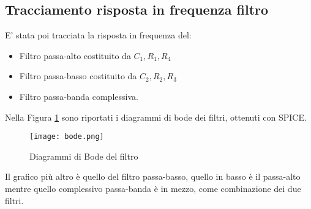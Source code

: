 \subsection{Tracciamento risposta in frequenza filtro}
E' stata poi tracciata la risposta in frequenza del:
\begin{itemize}
    \item Filtro passa-alto costituito da $C_1,R_1,R_4$
    \item Filtro passa-basso costituito da $C_2,R_2,R_3$
    \item Filtro passa-banda complessiva.
\end{itemize}
Nella Figura \ref{fig:bode} sono riportati i diagrammi di bode dei filtri, ottenuti con SPICE.
\begin{figure}[H]
    \centering
    \texttt{[image: bode.png]}
    \caption{Diagrammi di Bode del filtro}
    \label{fig:bode}
\end{figure}
Il grafico più altro è quello del filtro passa-basso, quello in basso è il passa-alto mentre quello complessivo passa-banda è in mezzo, come combinazione dei due filtri.